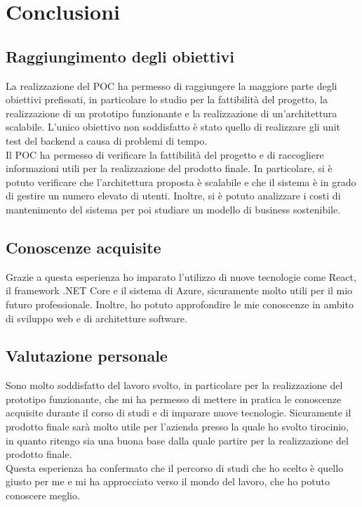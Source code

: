 \chapter{Conclusioni}
\label{cap:conclusioni}

\section{Raggiungimento degli obiettivi}
La realizzazione del POC ha permesso di raggiungere la maggiore parte degli obiettivi prefissati, in particolare lo studio per la fattibilità del progetto, la realizzazione di un prototipo funzionante e la realizzazione di un'architettura scalabile. L'unico obiettivo non soddisfatto è stato quello di realizzare gli unit test del backend a causa di problemi di tempo.\\
Il POC ha permesso di verificare la fattibilità del progetto e di raccogliere informazioni utili per la realizzazione del prodotto finale. In particolare, si è potuto verificare che l'architettura proposta è scalabile e che il sistema è in grado di gestire un numero elevato di utenti. Inoltre, si è potuto analizzare i costi di mantenimento del sistema per poi studiare un modello di business sostenibile.\\

\section{Conoscenze acquisite}
Grazie a questa esperienza ho imparato l'utilizzo di nuove tecnologie come React, il framework .NET Core e il sistema di Azure, sicuramente molto utili per il mio futuro professionale. Inoltre, ho potuto approfondire le mie conoscenze in ambito di sviluppo web e di architetture software.\\
\section{Valutazione personale}
Sono molto soddisfatto del lavoro svolto, in particolare per la realizzazione del prototipo funzionante, che mi ha permesso di mettere in pratica le conoscenze acquisite durante il corso di studi e di imparare nuove tecnologie. Sicuramente il prodotto finale sarà molto utile per l'azienda presso la quale ho svolto tirocinio, in quanto ritengo sia una buona base dalla quale partire per la realizzazione del prodotto finale.\\ Questa esperienza ha confermato che il percorso di studi che ho scelto è quello giusto per me e mi ha approcciato verso il mondo del lavoro, che ho potuto conoscere meglio.\\